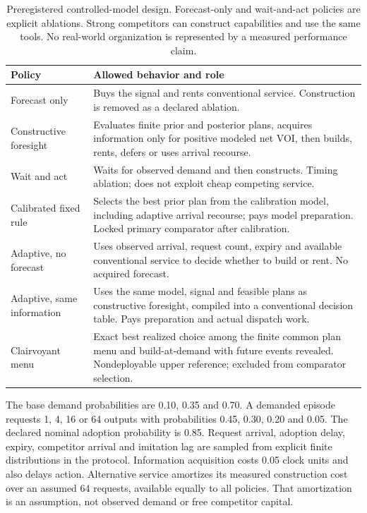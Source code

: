 \documentclass[11pt,a4paper]{article}
\begin{document}
\begin{table}[ht]\centering\small
\begin{tabularx}{\linewidth}{@{}L{35mm}Y@{}}\toprule
Policy & Allowed behavior and role \\\midrule
Forecast only & Buys the signal and rents conventional service. Construction is removed as a declared ablation. \\
Constructive foresight & Evaluates finite prior and posterior plans, acquires information only for positive modeled net VOI, then builds, rents, defers or uses arrival recourse. \\
Wait and act & Waits for observed demand and then constructs. Timing ablation; does not exploit cheap competing service. \\
Calibrated fixed rule & Selects the best prior plan from the calibration model, including adaptive arrival recourse; pays model preparation. Locked primary comparator after calibration. \\
Adaptive, no forecast & Uses observed arrival, request count, expiry and available conventional service to decide whether to build or rent. No acquired forecast. \\
Adaptive, same information & Uses the same model, signal and feasible plans as constructive foresight, compiled into a conventional decision table. Pays preparation and actual dispatch work. \\
Clairvoyant menu & Exact best realized choice among the finite common plan menu and build-at-demand with future events revealed. Nondeployable upper reference; excluded from comparator selection. \\\bottomrule
\end{tabularx}
\caption{Preregistered controlled-model design. Forecast-only and wait-and-act policies are explicit ablations. Strong competitors can construct capabilities and use the same tools. No real-world organization is represented by a measured performance claim.}
\label{tab:policies}\end{table}

The base demand probabilities are 0.10, 0.35 and 0.70. A demanded episode requests 1, 4, 16 or 64 outputs with probabilities 0.45, 0.30, 0.20 and 0.05. The declared nominal adoption probability is 0.85. Request arrival, adoption delay, expiry, competitor arrival and imitation lag are sampled from explicit finite distributions in the protocol. Information acquisition costs 0.05 clock units and also delays action. Alternative service amortizes its measured construction cost over an assumed 64 requests, available equally to all policies. That amortization is an assumption, not observed demand or free competitor capital.
\end{document}
